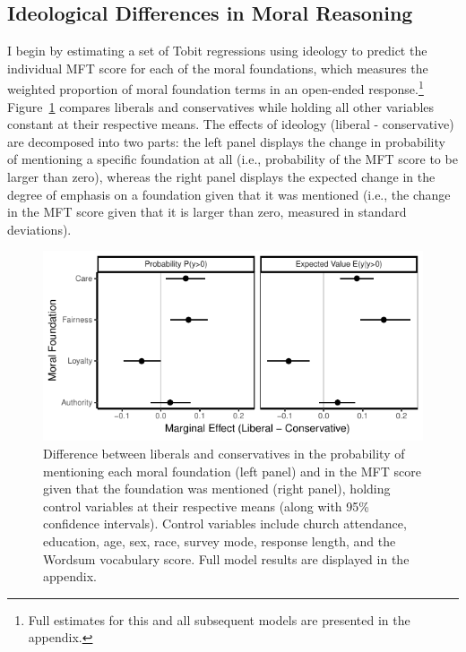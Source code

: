 \documentclass[12pt]{article}
\begin{document}


\subsection*{Ideological Differences in Moral Reasoning}

I begin by estimating a set of Tobit regressions using ideology to predict the individual MFT score for each of the moral foundations, which measures the weighted proportion of moral foundation terms in an open-ended response.\footnote{Full estimates for this and all subsequent models are presented in the appendix.} Figure~\ref{fig:tobit_ideol} compares liberals and conservatives while holding all other variables constant at their respective means. The effects of ideology (liberal - conservative) are decomposed into two parts: the left panel displays the change in probability of mentioning a specific foundation at all (i.e., probability of the MFT score to be larger than zero), whereas the right panel displays the expected change in the degree of emphasis on a foundation given that it was mentioned  (i.e., the change in the MFT score given that it is larger than zero, measured in standard deviations).

\begin{figure}[ht]\centering
\includegraphics{../calc/fig/tobit_ideol.pdf}
\caption{Difference between liberals and conservatives in the probability of mentioning each moral foundation (left panel) and in the MFT score given that the foundation was mentioned (right panel), holding control variables at their respective means (along with 95\% confidence intervals). Control variables include church attendance, education, age, sex, race, survey mode, response length, and the Wordsum vocabulary score. Full model results are displayed in the appendix.
}\label{fig:tobit_ideol}
\end{figure}
\end{document}
